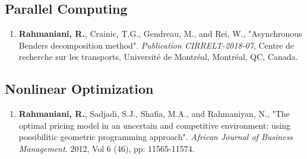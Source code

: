 \documentclass[10PT,letter]{article}
\newcommand{\subsectionstyle}[1]{\normalfont\selectfont\textcolor{titlecol}{\sffamily #1}}
\begin{document}
		\subsection*{\subsectionstyle{Parallel Computing}}
				\begin{enumerate}[itemsep=.5mm]
					\item 
								\textbf{Rahmaniani, R.}, Crainic, T.G., Gendreau, M., and Rei, W., "Asynchronous Benders decomposition method". \textit{Publication CIRRELT-2018-07}, Centre de recherche sur les transports, Universit\'e de Montr\'eal, Montr\'eal, QC, Canada. 
				\end{enumerate}
		\subsection*{\subsectionstyle{Nonlinear Optimization}}
		\begin{enumerate}[itemsep=.5mm]
			\item 
					\textbf{Rahmaniani, R.}, Sadjadi, S.J.,    Shafia, M.A., and Rahmaniyan, N., "The optimal pricing model in an uncertain and competitive environment: using possibilitic geometric programming approach". \textit{African Journal of Business Management}. 2012, Vol 6 (46), pp: 11565-11574.
		\end{enumerate}
	
	
\end{document}
